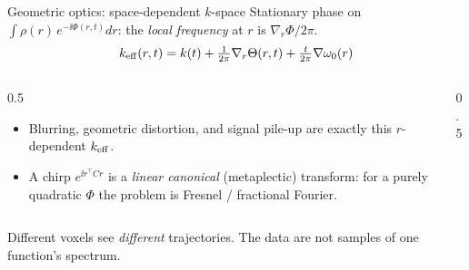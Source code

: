 \begin{frame}{Geometric optics: space-dependent $k$-space}
Stationary phase on $\int\rho(r)\,e^{-\ii\Phi(r,t)}dr$: the \emph{local frequency} at $r$ is $\nabla_r\Phi/2\pi$.
\vspace{-1mm}
\[ k_{\rm eff}(r,t)=k(t)+\tfrac1{2\pi}\nabla_r\Theta(r,t)+\tfrac{t}{2\pi}\nabla\omega_0(r)\]
\vspace{-6mm}
\begin{columns}[T]
\begin{column}{0.5\textwidth}
\begin{itemize}
\item Blurring, geometric distortion, and signal pile-up are exactly this $r$-dependent $k_{\rm eff}$.
\item A chirp $e^{\ii r^\top C r}$ is a \emph{linear canonical} (metaplectic) transform: for a purely quadratic $\Phi$ the problem is Fresnel / fractional Fourier.
\end{itemize}
\end{column}
\begin{column}{0.5\textwidth}
\centering
{}
\end{column}
\end{columns}
\pause
\medskip
Different voxels see \emph{different} trajectories. The data are not samples of one function's spectrum.
\end{frame}

